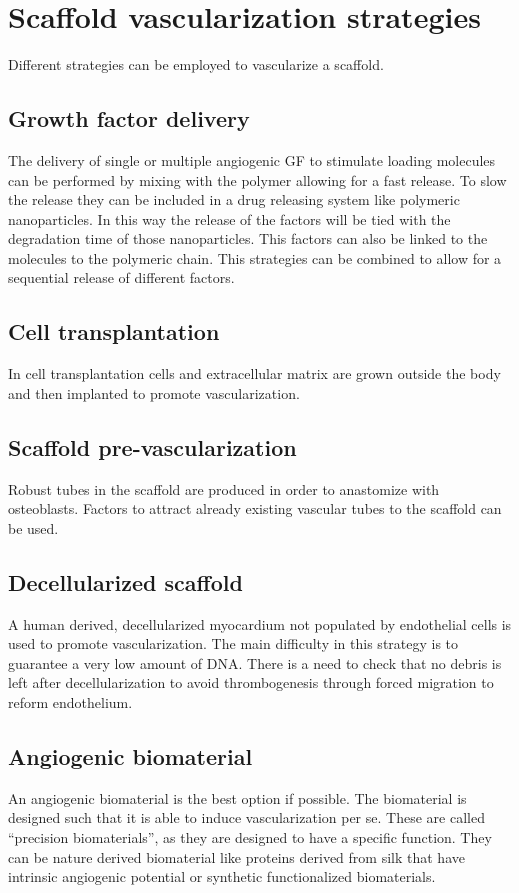 \section{Scaffold vascularization strategies}
Different strategies can be employed to vascularize a scaffold.

	\subsection{Growth factor delivery}
	The delivery of single or multiple angiogenic GF to stimulate loading molecules can be performed by mixing with the polymer allowing for a fast release.
	To slow the release they can be included in a drug releasing system like polymeric nanoparticles.
	In this way the release of the factors will be tied with the degradation time of those nanoparticles.
	This factors can also be linked to the molecules to the polymeric chain.
	This strategies can be combined to allow for a sequential release of different factors.

	\subsection{Cell transplantation}
	In cell transplantation cells and extracellular matrix are grown outside the body and then implanted to promote vascularization.

	\subsection{Scaffold pre-vascularization}
	Robust tubes in the scaffold are produced in order to anastomize with osteoblasts.
	Factors to attract already existing vascular tubes to the scaffold can be used.

	\subsection{Decellularized  scaffold}
	A human derived, decellularized myocardium not populated by endothelial cells is used to promote vascularization.
	The main difficulty in this strategy is to guarantee a very low amount of DNA.
	There is a need to check that no debris is left after decellularization to avoid thrombogenesis through forced migration to reform endothelium.

	\subsection{Angiogenic biomaterial}
	An angiogenic biomaterial is the best option if possible.
	The biomaterial is designed such that it is able to induce vascularization per se.
	These are called “precision biomaterials”, as they are designed to have a specific function.
	They can be nature derived biomaterial like proteins derived from silk that have intrinsic angiogenic potential or synthetic functionalized biomaterials.

